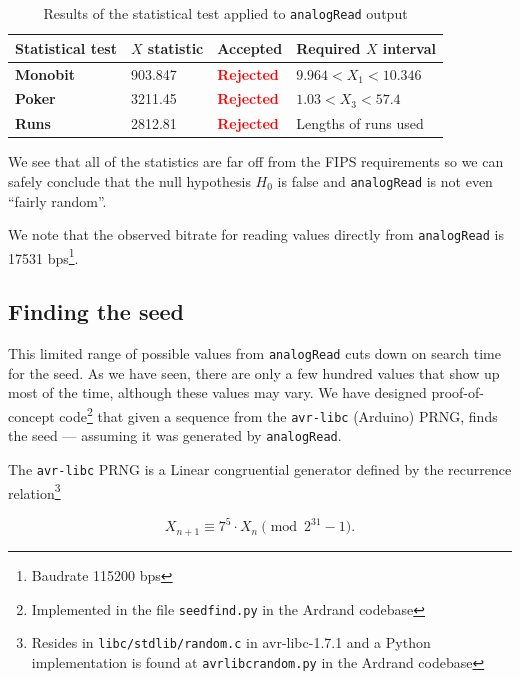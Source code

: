 \documentclass[a4paper]{article}           %
\begin{document}
  \begin{table}[H]
    \begin{center}
      \begin{tabular}{| l | l | l | l |}
        \hline
        Statistical test & $X$ statistic & Accepted & Required $X$ interval \\
        \hline
        \hline
        \textbf{Monobit} & 903.847 & \textcolor{red}{\textbf{Rejected}} & $9.964 < X_1 < 10.346$  \\
        \textbf{Poker} & 3211.45 & \textcolor{red}{\textbf{Rejected}} & $1.03 < X_3 < 57.4$ \\
        \textbf{Runs} & 2812.81 & \textcolor{red}{\textbf{Rejected}} & Lengths of runs used \\
        \hline
      \end{tabular}
    \end{center}
    \caption{Results of the statistical test applied to \texttt{analogRead} output}
    \label{tab:analogreadtests}
  \end{table}

We see that all of the statistics are far off from the FIPS requirements so we can safely conclude that the null hypothesis $H_0$ is false and \texttt{analogRead} is not even ``fairly random''. 

We note that the observed bitrate for reading values directly from \texttt{analogRead} is 17531 bps\footnote{Baudrate 115200 bps}. 

\subsection{Finding the seed}
\label{sec:seedfind}

This limited range of possible values from \texttt{analogRead} cuts down on search time for the seed. As we have seen, there are only a few hundred values that show up most of the time, although these values may vary. We have designed proof-of-concept code\footnote{Implemented in the file \texttt{seedfind.py} in the Ardrand codebase} that given a sequence from the \texttt{avr-libc} (Arduino) PRNG, finds the seed --- assuming it was generated by \texttt{analogRead}. 

The \texttt{avr-libc} PRNG is a Linear congruential generator defined by the recurrence relation\footnote{Resides in \texttt{libc/stdlib/random.c} in avr-libc-1.7.1 and a Python implementation is found at \texttt{avrlibcrandom.py} in the Ardrand codebase}

\[
X_{n+1} \equiv 7^5 \cdot X_n \pmod{2^{31} -1}.
\]
\end{document}
